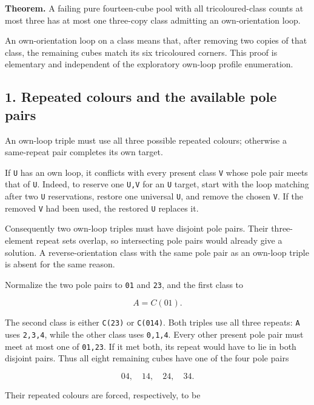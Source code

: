 \documentclass[
  10pt,
]{article}
\begin{document}
\textbf{Theorem.} A failing pure fourteen-cube pool with all
tricoloured-class counts at most three has at most one three-copy class
admitting an own-orientation loop.

An own-orientation loop on a class means that, after removing two copies
of that class, the remaining cubes match its six tricoloured corners.
This proof is elementary and independent of the exploratory own-loop
profile enumeration.

\hypertarget{repeated-colours-and-the-available-pole-pairs}{%
\subsection*{1. Repeated colours and the available pole
pairs}\label{repeated-colours-and-the-available-pole-pairs}}

An own-loop triple must use all three possible repeated colours;
otherwise a same-repeat pair completes its own target.

If \texttt{U} has an own loop, it conflicts with every present class
\texttt{V} whose pole pair meets that of \texttt{U}. Indeed, to reserve
one \texttt{U,V} for an \texttt{U} target, start with the loop matching
after two \texttt{U} reservations, restore one universal \texttt{U}, and
remove the chosen \texttt{V}. If the removed \texttt{V} had been used,
the restored \texttt{U} replaces it.

Consequently two own-loop triples must have disjoint pole pairs. Their
three-element repeat sets overlap, so intersecting pole pairs would
already give a solution. A reverse-orientation class with the same pole
pair as an own-loop triple is absent for the same reason.

Normalize the two pole pairs to \texttt{01} and \texttt{23}, and the
first class to

\[
A=C(01).
\]

The second class is either \texttt{C(23)} or \texttt{C(014)}. Both
triples use all three repeats: \texttt{A} uses \texttt{2,3,4}, while the
other class uses \texttt{0,1,4}. Every other present pole pair must meet
at most one of \texttt{01,23}. If it met both, its repeat would have to
lie in both disjoint pairs. Thus all eight remaining cubes have one of
the four pole pairs

\[
04,\quad14,\quad24,\quad34.
\]

Their repeated colours are forced, respectively, to be
\end{document}
